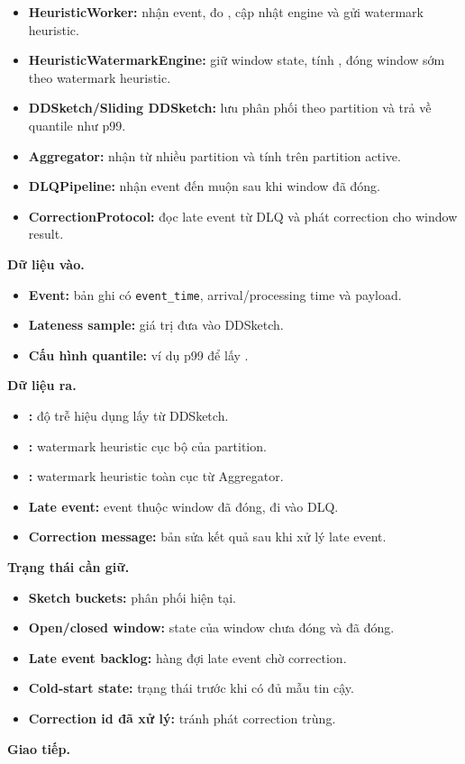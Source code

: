 \documentclass[12pt,a4paper]{article}
\begin{document}
\begin{itemize}
\item \textbf{HeuristicWorker:} nhận event, đo , cập nhật engine và gửi watermark heuristic.
\item \textbf{HeuristicWatermarkEngine:} giữ window state, tính , đóng window sớm theo watermark heuristic.
\item \textbf{DDSketch/Sliding DDSketch:} lưu phân phối  theo partition và trả về quantile như p99.
\item \textbf{Aggregator:} nhận  từ nhiều partition và tính  trên partition active.
\item \textbf{DLQPipeline:} nhận event đến muộn sau khi window đã đóng.
\item \textbf{CorrectionProtocol:} đọc late event từ DLQ và phát correction cho window result.
\end{itemize}
\textbf{Dữ liệu vào.}

\begin{itemize}
\item \textbf{Event:} bản ghi có \texttt{event\_time}, arrival/processing time và payload.
\item \textbf{Lateness sample:} giá trị  đưa vào DDSketch.
\item \textbf{Cấu hình quantile:} ví dụ p99 để lấy .
\end{itemize}
\textbf{Dữ liệu ra.}

\begin{itemize}
\item \textbf{:} độ trễ hiệu dụng lấy từ DDSketch.
\item \textbf{:} watermark heuristic cục bộ của partition.
\item \textbf{:} watermark heuristic toàn cục từ Aggregator.
\item \textbf{Late event:} event thuộc window đã đóng, đi vào DLQ.
\item \textbf{Correction message:} bản sửa kết quả sau khi xử lý late event.
\end{itemize}
\textbf{Trạng thái cần giữ.}

\begin{itemize}
\item \textbf{Sketch buckets:} phân phối  hiện tại.
\item \textbf{Open/closed window:} state của window chưa đóng và đã đóng.
\item \textbf{Late event backlog:} hàng đợi late event chờ correction.
\item \textbf{Cold-start state:} trạng thái trước khi  có đủ mẫu tin cậy.
\item \textbf{Correction id đã xử lý:} tránh phát correction trùng.
\end{itemize}
\textbf{Giao tiếp.}
\end{document}
